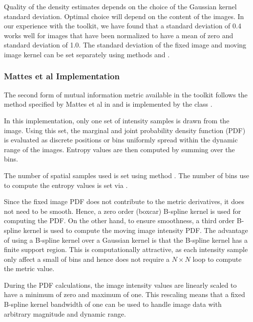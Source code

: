Quality of the density estimates depends on the choice of the Gaussian kernel
standard deviation. Optimal choice will depend on the content of the images.
In our experience with the toolkit, we have found that a standard deviation
of 0.4 works well for images that have been normalized to have a mean
of zero and standard deviation of 1.0. The standard deviation of the fixed image
and moving image kernel can be set separately using methods 
 and .

\subsubsection{Mattes et al Implementation}
The second form of mutual information metric available in the toolkit follows
the method specified by Mattes et al in \cite{Mattes2001} and is implemented by
the class  .

In this implementation, only one set of intensity samples is drawn from the image.
Using this set, the marginal and joint probability density function (PDF)
is evaluated as discrete positions or bins uniformly spread within the dynamic range
of the images. Entropy values are then computed by summing over the bins.


The number of spatial samples used is set using method 
. The number of bins use to compute
the entropy values is set via .

Since the fixed image PDF does not contribute to the metric derivatives, it does
not need to be smooth. Hence, a zero order (boxcar) B-spline kernel is
used for computing the PDF. On the other hand, to ensure smoothness,
a third order B-spline kernel is used to compute the moving image
intensity PDF. The advantage of using a B-spline kernel over a Gaussian kernel
is that the B-spline kernel has a finite support region. This is 
computationally attractive, as each intensity sample only affect a small
of bins and hence does not require a $N \times N$ loop to compute the
metric value.

During the PDF calculations, the image intensity values are linearly scaled to have
a minimum of zero and maximum of one. This rescaling means that a fixed
B-spline kernel bandwidth of one can be used to handle image data 
with arbitrary magnitude and dynamic range.

